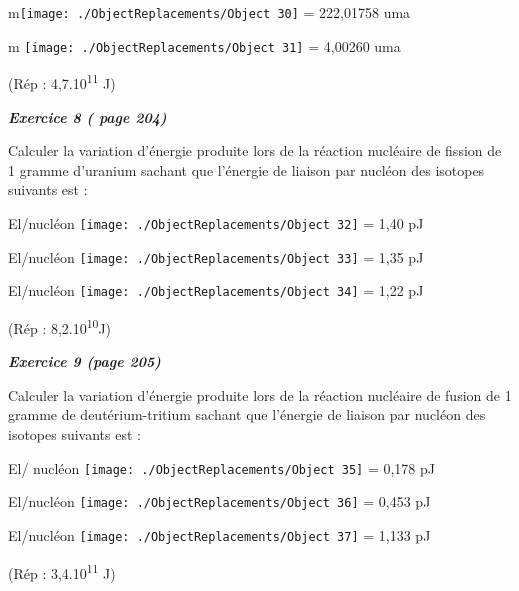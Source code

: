 m\texttt{[image: ./ObjectReplacements/Object 30]}
= 222,01758 uma

m
\texttt{[image: ./ObjectReplacements/Object 31]}
= 4,00260 uma

(Rép : 4,7.10\textsuperscript{11} J)

\emph{\textbf{Exercice 8 ( page 204)}}

Calculer la variation d'énergie produite lors de la réaction nucléaire
de fission de 1 gramme d'uranium sachant que l'énergie de liaison par
nucléon des isotopes suivants est :

El/nucléon
\texttt{[image: ./ObjectReplacements/Object 32]}
= 1,40 pJ

El/nucléon
\texttt{[image: ./ObjectReplacements/Object 33]}
= 1,35 pJ

El/nucléon
\texttt{[image: ./ObjectReplacements/Object 34]}
= 1,22 pJ

(Rép : 8,2.10\textsuperscript{10}J)

\emph{\textbf{Exercice 9 (page 205)}}

Calculer la variation d'énergie produite lors de la réaction nucléaire
de fusion de 1 gramme de deutérium-tritium sachant que l'énergie de
liaison par nucléon des isotopes suivants est :

El/ nucléon
\texttt{[image: ./ObjectReplacements/Object 35]}
= 0,178 pJ

El/nucléon
\texttt{[image: ./ObjectReplacements/Object 36]}
= 0,453 pJ

El/nucléon
\texttt{[image: ./ObjectReplacements/Object 37]}
= 1,133 pJ

(Rép : 3,4.10\textsuperscript{11} J)

